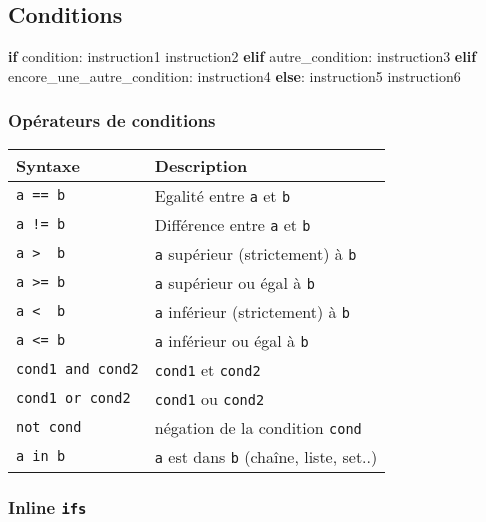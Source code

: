 \documentclass[]{article}
\newenvironment{Shaded}{}{}
\newcommand{\ControlFlowTok}[1]{\textcolor[rgb]{0.00,0.44,0.13}{\textbf{#1}}}
\newcommand{\NormalTok}[1]{#1}
\begin{document}
\hypertarget{conditions}{%
\subsection{Conditions}\label{conditions}}

\begin{Shaded}
\begin{Highlighting}[]
\ControlFlowTok{if}\NormalTok{ condition:}
\NormalTok{    instruction1}
\NormalTok{    instruction2}
\ControlFlowTok{elif}\NormalTok{ autre_condition:}
\NormalTok{    instruction3}
\ControlFlowTok{elif}\NormalTok{ encore_une_autre_condition:}
\NormalTok{    instruction4}
\ControlFlowTok{else}\NormalTok{:}
\NormalTok{    instruction5}
\NormalTok{    instruction6}
\end{Highlighting}
\end{Shaded}

\hypertarget{opuxe9rateurs-de-conditions}{%
\subsubsection{Opérateurs de
conditions}\label{opuxe9rateurs-de-conditions}}

\begin{longtable}[]{@{}ll@{}}
\toprule
Syntaxe & Description\tabularnewline
\midrule
\endhead
\texttt{a\ ==\ b} & Egalité entre \texttt{a} et
\texttt{b}\tabularnewline
\texttt{a\ !=\ b} & Différence entre \texttt{a} et
\texttt{b}\tabularnewline
\texttt{a\ \textgreater{}\ \ b} & \texttt{a} supérieur (strictement) à
\texttt{b}\tabularnewline
\texttt{a\ \textgreater{}=\ b} & \texttt{a} supérieur ou égal à
\texttt{b}\tabularnewline
\texttt{a\ \textless{}\ \ b} & \texttt{a} inférieur (strictement) à
\texttt{b}\tabularnewline
\texttt{a\ \textless{}=\ b} & \texttt{a} inférieur ou égal à
\texttt{b}\tabularnewline
\texttt{cond1\ and\ cond2} & \texttt{cond1} et
\texttt{cond2}\tabularnewline
\texttt{cond1\ or\ cond2} & \texttt{cond1} ou
\texttt{cond2}\tabularnewline
\texttt{not\ cond} & négation de la condition
\texttt{cond}\tabularnewline
\texttt{a\ in\ b} & \texttt{a} est dans \texttt{b} (chaîne, liste,
set..)\tabularnewline
\bottomrule
\end{longtable}

\hypertarget{inline-ifs}{%
\subsubsection{\texorpdfstring{Inline
\texttt{ifs}}{Inline ifs}}\label{inline-ifs}}
\end{document}
